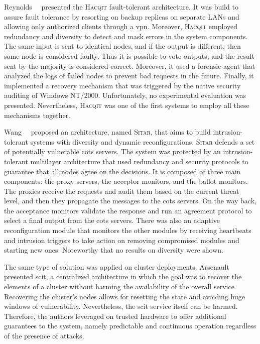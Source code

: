 Reynolds~\etal{}~\cite{Reynolds:2002} presented the \textsc{Hacqit} fault-tolerant architecture.
It was build to assure fault tolerance by resorting on backup replicas on separate LANs and allowing only authorized clients through a \gls{vpn}.
Moreover, \textsc{Hacqit} employed redundancy and diversity to detect and mask errors in the system components.
The same input is sent to identical nodes, and if the output is different, then some node is considered faulty. 
Thus it is possible to vote outputs, and the result sent by the majority is considered correct.
Moreover, it used a forensic agent that analyzed the logs of failed nodes to prevent bad requests in the future.
Finally, it implemented a recovery mechanism that was triggered by the native security auditing of Windows NT/2000.
Unfortunately, no experimental evaluation was presented.
Nevertheless, \textsc{Hacqit} was one of the first systems to employ all these mechanisms together.


Wang~\etal{}~\cite{Wang:2003} proposed an architecture, named \textsc{Sitar}, that aims to build intrusion-tolerant systems with diversity and dynamic reconfigurations.
\textsc{Sitar} defends a set of potentially vulnerable \gls{cots} servers. 
The system was protected by an intrusion-tolerant multilayer architecture that used redundancy and security protocols to guarantee that all nodes agree on the decisions.
It is composed of three main components: the proxy servers, the acceptor monitors, and the ballot monitors.
The proxies receive the requests and audit them based on the current threat level, and then they propagate the messages to the \gls{cots} servers. 
On the way back, the acceptance monitors validate the response and run an agreement protocol to select a final output from the \gls{cots} servers.
There was also an adaptive reconfiguration module that monitors the other modules by receiving heartbeats and intrusion triggers to take action on removing compromised modules and starting new ones.
Noteworthy that no results on diversity were shown.


The same type of solution was applied on cluster deployments.
Arsenault~\etal{}~\cite{Arsenault:2007} presented \gls{scit}, a centralized architecture in which the goal was to recover the elements of a cluster without harming the availability of the overall service.
Recovering the cluster's nodes allows for resetting the state and avoiding huge windows of vulnerability.
Nevertheless, the \gls{scit} service itself can be harmed. 
Therefore, the authors leveraged on trusted hardware to offer additional guarantees to the system, namely predictable and continuous operation regardless of the presence of attacks.


